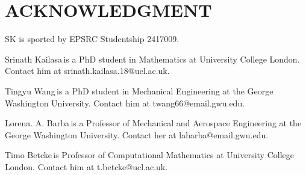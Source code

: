 \documentclass{IEEEcsmag}
\begin{document}
\section{ACKNOWLEDGMENT}

SK is sported by EPSRC Studentship 2417009.





\begin{IEEEbiography}{Srinath Kailasa}{\,}is a PhD student in Mathematics at University College London. Contact him at srinath.kailasa.18@ucl.ac.uk.
\end{IEEEbiography}

\begin{IEEEbiography}{Tingyu Wang}{\,}is a PhD student in Mechanical Engineering at the George Washington University. Contact him at twang66@email.gwu.edu.
\end{IEEEbiography}

\begin{IEEEbiography}{Lorena. A. Barba}{\,}is a Professor of Mechanical and Aerospace Engineering at the George Washington University.  Contact her at labarba@email.gwu.edu.
\end{IEEEbiography}

\begin{IEEEbiography}{Timo Betcke}{\,}is Professor of Computational Mathematics at University College London. Contact him at t.betcke@ucl.ac.uk.
\end{IEEEbiography}
\end{document}

